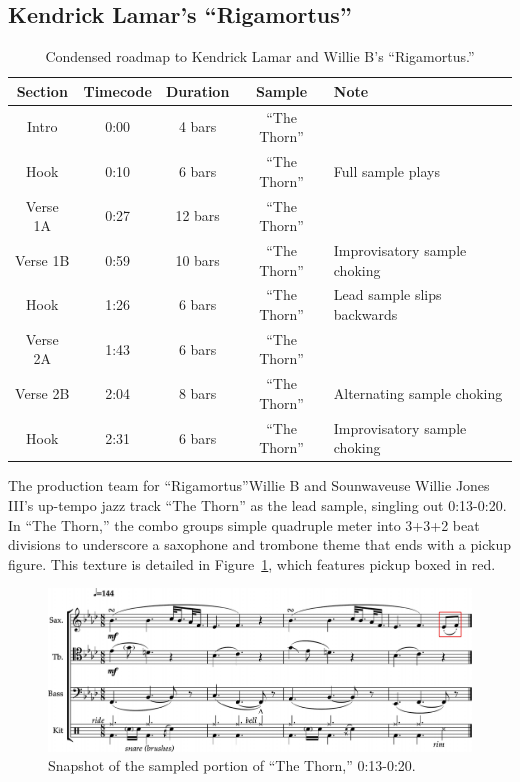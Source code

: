 \subsection*{\centering Kendrick Lamar's ``Rigamortus''}

    \begin{table}[h]
        \centering
            \begin{tabular}{|c|c|c|c|l|}
                \hline
                Section  & Timecode & Duration & Sample        & Note \\ \hline
                Intro    & 0:00     & 4 bars   & ``The Thorn'' & \\ \hline
                Hook     & 0:10     & 6 bars   & ``The Thorn'' & Full sample plays \\ \hline
                Verse 1A & 0:27     & 12 bars  & ``The Thorn'' & \\ \hline
                Verse 1B & 0:59     & 10 bars  & ``The Thorn'' & Improvisatory sample choking \\ \hline
                Hook     & 1:26     & 6 bars   & ``The Thorn'' & Lead sample slips backwards \\ \hline
                Verse 2A & 1:43     & 6 bars   & ``The Thorn'' & \\ \hline
                Verse 2B & 2:04     & 8 bars   & ``The Thorn'' & Alternating sample choking \\ \hline
                Hook     & 2:31     & 6 bars   & ``The Thorn'' & Improvisatory sample choking\\ \hline
            \end{tabular}
        \caption{Condensed roadmap to Kendrick Lamar and Willie B's ``Rigamortus.''}
        \label{tab:rigamortus}
    \end{table}

The production team for ``Rigamortus''\textemdash Willie B and Sounwave\textemdash use Willie Jones III's up-tempo jazz track ``The Thorn'' as the lead sample,  singling out 0:13-0:20. In ``The Thorn,'' the combo groups simple quadruple meter into 3+3+2 beat divisions to underscore a saxophone and trombone theme that ends with a pickup figure. This texture is detailed in Figure~\ref{fig:thethornfull}, which features pickup boxed in red.

    \begin{figure}[ht]
        \centering
        \includegraphics[width=\textwidth]{images/figures/chp 02/013020thethornfull.pdf}
        \caption{Snapshot of the sampled portion of ``The Thorn,'' 0:13-0:20.}
        \label{fig:thethornfull}
    \end{figure}


